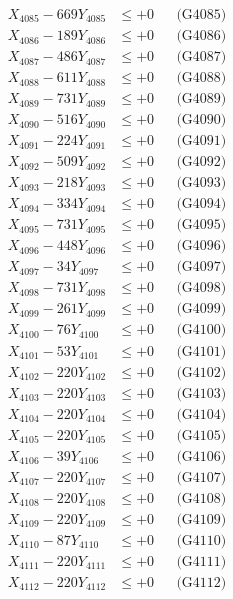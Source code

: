 \documentclass[a4paper,10pt]{article}
\begin{document}
{\begin{align}
X_{4085} - 669Y_{4085} &\leq +0 && \text{(G4085)} \\
X_{4086} - 189Y_{4086} &\leq +0 && \text{(G4086)} \\
X_{4087} - 486Y_{4087} &\leq +0 && \text{(G4087)} \\
X_{4088} - 611Y_{4088} &\leq +0 && \text{(G4088)} \\
X_{4089} - 731Y_{4089} &\leq +0 && \text{(G4089)} \\
X_{4090} - 516Y_{4090} &\leq +0 && \text{(G4090)} \\
\allowbreak
X_{4091} - 224Y_{4091} &\leq +0 && \text{(G4091)} \\
X_{4092} - 509Y_{4092} &\leq +0 && \text{(G4092)} \\
X_{4093} - 218Y_{4093} &\leq +0 && \text{(G4093)} \\
X_{4094} - 334Y_{4094} &\leq +0 && \text{(G4094)} \\
X_{4095} - 731Y_{4095} &\leq +0 && \text{(G4095)} \\
X_{4096} - 448Y_{4096} &\leq +0 && \text{(G4096)} \\
X_{4097} - 34Y_{4097} &\leq +0 && \text{(G4097)} \\
X_{4098} - 731Y_{4098} &\leq +0 && \text{(G4098)} \\
X_{4099} - 261Y_{4099} &\leq +0 && \text{(G4099)} \\
X_{4100} - 76Y_{4100} &\leq +0 && \text{(G4100)} \\
\allowbreak
X_{4101} - 53Y_{4101} &\leq +0 && \text{(G4101)} \\
X_{4102} - 220Y_{4102} &\leq +0 && \text{(G4102)} \\
X_{4103} - 220Y_{4103} &\leq +0 && \text{(G4103)} \\
X_{4104} - 220Y_{4104} &\leq +0 && \text{(G4104)} \\
X_{4105} - 220Y_{4105} &\leq +0 && \text{(G4105)} \\
X_{4106} - 39Y_{4106} &\leq +0 && \text{(G4106)} \\
X_{4107} - 220Y_{4107} &\leq +0 && \text{(G4107)} \\
X_{4108} - 220Y_{4108} &\leq +0 && \text{(G4108)} \\
X_{4109} - 220Y_{4109} &\leq +0 && \text{(G4109)} \\
X_{4110} - 87Y_{4110} &\leq +0 && \text{(G4110)} \\
\allowbreak
X_{4111} - 220Y_{4111} &\leq +0 && \text{(G4111)} \\
X_{4112} - 220Y_{4112} &\leq +0 && \text{(G4112)} \\

\end{align}}
\end{document}
